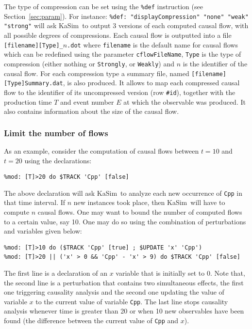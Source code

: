 \documentclass[11pt]{book}
\def\KaSim{\textsf{KaSim}}
\def\ttt#1{\texttt{#1}}
\def\var#1{{\textquotesingle}#1{\textquotesingle}}
\begin{document}
The type of compression can be set using the \texttt{\%def} instruction (see Section~\ref{sec:param}). For instance:
\lstinline[language=kappa]!%def: "displayCompression" "none" "weak" "strong"!
will ask \KaSim~to output 3 versions of each computed causal flow, with all possible degrees of compressions. Each causal flow is outputted into a file \texttt{[filename][Type]\_$n$.dot} where \texttt{filename} is the default name for causal flows which can be redefined using the parameter \texttt{cflowFileName}, \texttt{Type} is the type of compression (either nothing or \texttt{Strongly}, or \texttt{Weakly}) and $n$ is the identifier of the causal flow. For each compression type a summary file, named \texttt{[filename][Type]Summary.dat}, is also produced. It allows to map each compressed causal flow to the identifier of its uncompressed version (row \texttt{\#id}), together with the production time $T$ and event number $E$ at which the observable was produced. It also contains information about the size of the causal flow.

\subsubsection{Limit the number of flows}
As an example, consider the computation of causal flows between $t=10$ and $t=20$ using the declarations:
\begin{lstlisting}[language=kappa]
%mod: [T]>10 do $TRACK 'Cpp' [true]
%mod: [T]>20 do $TRACK 'Cpp' [false]
\end{lstlisting}

The above declaration will ask \KaSim~to analyze each new occurrence of \ttt{\var{Cpp}} in that time interval. If $n$ new instances took place, then \KaSim~will have to compute $n$ causal flows. One may want to bound the number of computed flows to a certain value, say 10. One may do so using the combination of perturbations and variables given below:
\begin{lstlisting}[language=kappa]
%var: 'x' 0
%mod: [T]>10 do ($TRACK 'Cpp' [true] ; $UPDATE 'x' 'Cpp')
%mod: [T]>20 || ('x' > 0 && 'Cpp' - 'x' > 9) do $TRACK 'Cpp' [false]
\end{lstlisting}
The first line is a declaration of an $x$ variable that is initially set to 0. Note that, the second line is a perturbation that contains two simultaneous effects, the first one triggering causality analysis and the second one updating the value of variable $x$ to the current value of variable \ttt{\var{Cpp}}.
The last line stops causality analysis whenever time is greater than 20 or when 10 new observables have been found (the difference between the current value of \ttt{\var{Cpp}} and $x$).
\end{document}
